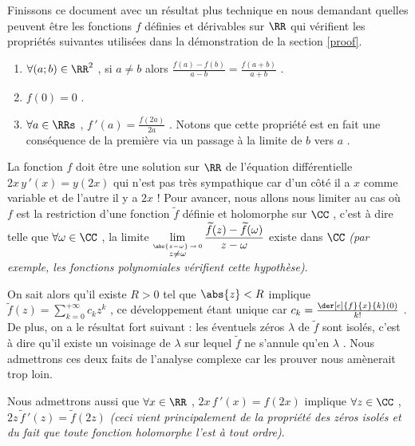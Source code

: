 Finissons ce document avec un résultat plus technique en nous demandant quelles peuvent être les fonctions $f$ définies et dérivables sur $\RR$ qui vérifient les propriétés suivantes utilisées dans la démonstration de la section \ref{proof}.
\begin{enumerate}
	\item $\forall (a ; b) \in \RR^2$ , si $a \neq b$ alors $\frac{f(a) - f(b)}{a - b} = \frac{f(a + b)}{a + b}$ .

	\item $f(0) = 0$ .

	\item $\forall a \in \RRs$ , $f\,'(a) = \frac{f(2 a)}{2 a}$ . Notons que cette propriété est en fait une conséquence de la première via un passage à la limite de $b$ vers $a$ .
\end{enumerate}


\medskip


La fonction $f$ doit être une solution sur $\RR$ de l'équation différentielle $2 x \, y\,'(x) = y(2x)$ qui n'est pas très sympathique car d'un côté il a $x$ comme variable et de l'autre il y a $2x$ !
Pour avancer, nous allons nous limiter au cas où $f$ est la restriction d'une fonction $\widetilde{f}$ définie et holomorphe sur $\CC$ , c'est à dire telle que $\forall \omega \in \CC$ , la limite $\displaystyle \lim_{\stackrel{\abs{z - \omega} \, \rightarrow \, 0}{z \neq \omega}} \frac{\widetilde{f}(z) - \widetilde{f}(\omega)}{z - \omega}$ existe dans $\CC$
\emph{(par exemple, les fonctions polynomiales vérifient cette hypothèse)}.


\medskip

On sait alors qu'il existe $R > 0$ tel que $\abs{z} < R$ implique
$\displaystyle \widetilde{f}(z) = \sum_{k = 0}^{+ \infty} c_k z^k$ , ce développement étant unique car $c_k = \frac{\der[e]{f}{x}{k}(0)}{k!}$ .
De plus, on a le résultat fort suivant : les éventuels zéros $\lambda$ de $\widetilde{f}$ sont isolés, c'est à dire qu'il existe un voisinage de $\lambda$ sur lequel $\widetilde{f}$ ne s'annule qu'en $\lambda$ . Nous admettrons ces deux faits de l'analyse complexe car les prouver nous amènerait trop loin.


\medskip

Nous admettrons aussi que $\forall x \in \RR$ , $2 x \, f\,'(x) = f(2x)$ implique $\forall z \in \CC$ , $2 z \, \widetilde{f}\,'(z) = \widetilde{f}(2z)$ \emph{(ceci vient principalement de la propriété des zéros isolés et du fait que toute fonction holomorphe l'est à tout ordre)}. 


